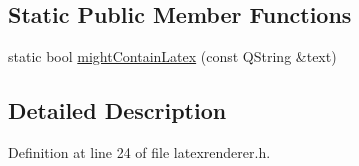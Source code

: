 \subsection*{Static Public Member Functions}
\begin{DoxyCompactItemize}
\item 
static bool \hyperlink{classGuiUtils_1_1LatexRenderer_aa7d63d0c278641e52479f50f8c97c094}{might\+Contain\+Latex} (const Q\+String \&text)
\end{DoxyCompactItemize}


\subsection{Detailed Description}


Definition at line 24 of file latexrenderer.\+h.



